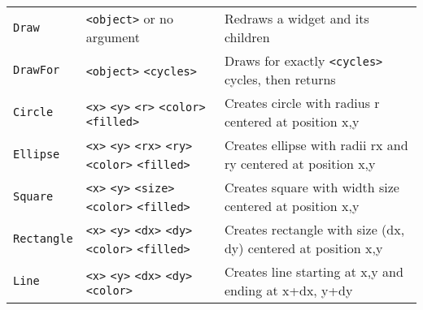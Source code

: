 \begin{longtable}{p{3cm}p{3cm}p{6cm}}
\verb+Draw+ &\verb+<object>+ or no argument &Redraws a widget and its children\\ 
\verb+DrawFor+ &\verb+<object>+ \verb+<cycles>+ &Draws for exactly \verb+<cycles>+ cycles, then returns\\ 
\verb+Circle+ &\verb+<x>+ \verb+<y>+ \verb+<r>+  \verb+<color>+ \verb+<filled>+&Creates circle with radius r centered at position x,y\\ 
\verb+Ellipse+ &\verb+<x>+ \verb+<y>+ \verb+<rx>+ \verb+<ry>+\verb+<color>+ \verb+<filled>+&Creates ellipse with radii rx and ry centered at position x,y\\ 
\verb+Square+ &\verb+<x>+ \verb+<y>+ \verb+<size>+ \verb+<color>+ \verb+<filled>+&Creates square with width size centered at position x,y\\ 
\verb+Rectangle+ &\verb+<x>+ \verb+<y>+ \verb+<dx>+ \verb+<dy>+\verb+<color>+ \verb+<filled>+ &Creates rectangle with size (dx, dy) centered at position x,y\\ 
\verb+Line+ &\verb+<x>+ \verb+<y>+ \verb+<dx>+ \verb+<dy>+  \verb+<color>+ &Creates line starting at x,y and ending at x+dx, y+dy\\ 


\end{longtable}

